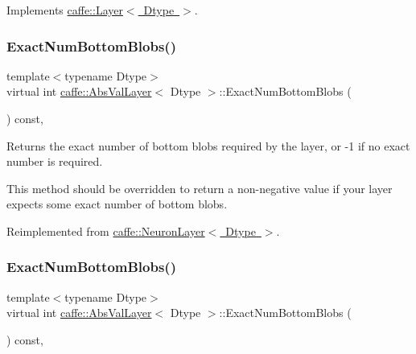 Implements \mbox{\hyperlink{classcaffe_1_1_layer_a75c9b2a321dc713e0eaef530d02dc37f}{caffe\+::\+Layer$<$ Dtype $>$}}.

\mbox{\label{classcaffe_1_1_abs_val_layer_acac806dbc6d3fa3dd7daae00caabd731}} 
\subsubsection{\texorpdfstring{Exact\+Num\+Bottom\+Blobs()}{ExactNumBottomBlobs()}\hspace{0.1cm}{\footnotesize\ttfamily [1/2]}}
{\footnotesize\ttfamily template$<$typename Dtype$>$ \\
virtual int \mbox{\hyperlink{classcaffe_1_1_abs_val_layer}{caffe\+::\+Abs\+Val\+Layer}}$<$ Dtype $>$\+::Exact\+Num\+Bottom\+Blobs (\begin{DoxyParamCaption}{ }\end{DoxyParamCaption}) const\hspace{0.3cm}{\ttfamily [inline]}, {\ttfamily [virtual]}}



Returns the exact number of bottom blobs required by the layer, or -\/1 if no exact number is required. 

This method should be overridden to return a non-\/negative value if your layer expects some exact number of bottom blobs. 

Reimplemented from \mbox{\hyperlink{classcaffe_1_1_neuron_layer_abb6c0e6acd2863baf47d6e6acda6f55f}{caffe\+::\+Neuron\+Layer$<$ Dtype $>$}}.

\mbox{\label{classcaffe_1_1_abs_val_layer_acac806dbc6d3fa3dd7daae00caabd731}} 
\subsubsection{\texorpdfstring{Exact\+Num\+Bottom\+Blobs()}{ExactNumBottomBlobs()}\hspace{0.1cm}{\footnotesize\ttfamily [2/2]}}
{\footnotesize\ttfamily template$<$typename Dtype$>$ \\
virtual int \mbox{\hyperlink{classcaffe_1_1_abs_val_layer}{caffe\+::\+Abs\+Val\+Layer}}$<$ Dtype $>$\+::Exact\+Num\+Bottom\+Blobs (\begin{DoxyParamCaption}{ }\end{DoxyParamCaption}) const\hspace{0.3cm}{\ttfamily [inline]}, {\ttfamily [virtual]}}



